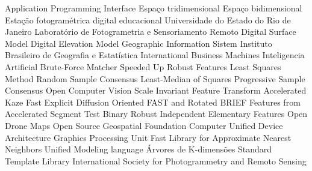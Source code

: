    {Application Programming Interface}
   {Espaço tridimensional}
   {Espaço bidimensional}
   {Estação fotogramétrica digital educacional}
   {Universidade do Estado do Rio de Janeiro}
   {Laboratório de Fotogrametria e Sensoriamento Remoto}
   {Digital Surface Model}
   {Digital Elevation Model}
   {Geographic Information Sistem}
   {Instituto Brasileiro de Geografia e Estatística}
   {International Business Machines}
   {Inteligencia Artificial}
   {Brute-Force Matcher}
   {Speeded Up Robust Features}
   {Least Squares Method}
   {Random Sample Consensus}
   {Least-Median of Squares}
   {Progressive Sample Consensus}
   {Open Computer Vision}
   {Scale Invariant Feature Transform}
   {Accelerated Kaze }
   {Fast Explicit Diffusion}
   {Oriented FAST and Rotated BRIEF}
   {Features from Accelerated Segment Test}
   {Binary Robust Independent Elementary Features}
   {Open Drone Maps}
   {Open Source Geospatial Foundation}
   {Computer Unified Device
Architecture}
   {Graphics Processing Unit}
   {Fast Library for Approximate Nearest Neighbors}
   {Unified Modeling language}
   {Árvores de K-dimensões}
   {Standard Template Library}   
   {International Society for Photogrammetry and Remoto Sensing}   


